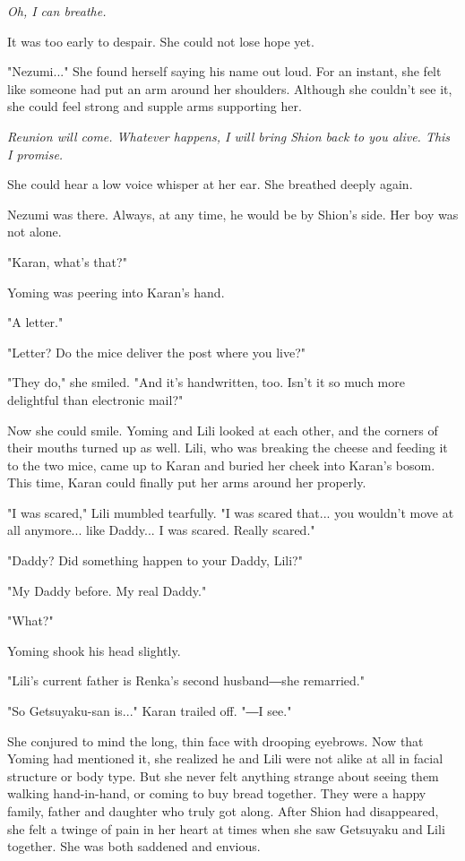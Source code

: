 \emph{Oh, I can breathe.}

It was too early to despair. She could not lose hope yet.

"Nezumi..." She found herself saying his name out loud. For an instant,
she felt like someone had put an arm around her shoulders. Although she
couldn't see it, she could feel strong and supple arms supporting her.

\emph{Reunion will come. Whatever happens, I will bring Shion back to you
alive. This I promise.}

She could hear a low voice whisper at her ear. She breathed deeply
again.

Nezumi was there. Always, at any time, he would be by Shion's side. Her
boy was not alone.

"Karan, what's that?"

Yoming was peering into Karan's hand.

"A letter."

"Letter? Do the mice deliver the post where you live?"

"They do," she smiled. "And it's handwritten, too. Isn't it so much more
delightful than electronic mail?"

Now she could smile. Yoming and Lili looked at each other, and the
corners of their mouths turned up as well. Lili, who was breaking the
cheese and feeding it to the two mice, came up to Karan and buried her
cheek into Karan's bosom. This time, Karan could finally put her arms
around her properly.

"I was scared," Lili mumbled tearfully. "I was scared that... you
wouldn't move at all anymore... like Daddy... I was scared. Really
scared."

"Daddy? Did something happen to your Daddy, Lili?"

"My Daddy before. My real Daddy."

"What?"

Yoming shook his head slightly.

"Lili's current father is Renka's second husband―she remarried."

"So Getsuyaku-san is..." Karan trailed off. "―I see."

She conjured to mind the long, thin face with drooping eyebrows. Now
that Yoming had mentioned it, she realized he and Lili were not alike at
all in facial structure or body type. But she never felt anything
strange about seeing them walking hand-in-hand, or coming to buy bread
together. They were a happy family, father and daughter who truly got
along. After Shion had disappeared, she felt a twinge of pain in her
heart at times when she saw Getsuyaku and Lili together. She was both
saddened and envious.

